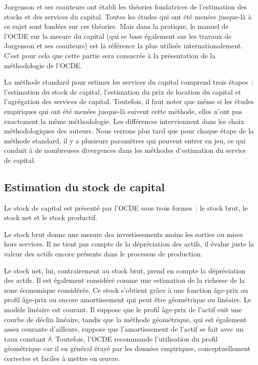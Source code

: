 \documentclass[12pt,a4paper,oneside]{report}
\begin{document}
Jorgenson et ses coauteurs ont établi les théories fondatrices de l’estimation des stocks et des services du
capital. Toutes les études qui ont été menées jusque-là à ce sujet sont fondées sur ces théories. Mais dans la
pratique, le manuel de l’OCDE sur la mesure du capital (qui se base également sur les travaux de Jorgenson et
ses coauteurs) est la référence la plus utilisée internationalement. C’est pour cela que cette partie sera
consacrée à la présentation de la méthodologie de l’OCDE.

La méthode standard pour estimer les services du capital comprend trois étapes~: l’estimation du stock de
capital, l’estimation du prix de location du capital et l’agrégation des services de capital. Toutefois, il
faut noter que même si les études empiriques qui ont été menées jusque-là suivent cette méthode, elles n’ont
pas exactement la même méthodologie. Les différences interviennent dans les choix méthodologiques des auteurs.
Nous verrons plus tard que pour chaque étape de la méthode standard, il y a plusieurs paramètres qui peuvent
entrer en jeu, ce qui conduit à de nombreuses divergences dans les méthodes d’estimation du service de
capital.

\subsection{Estimation du stock de capital}

Le stock de capital est présenté par l’OCDE sous trois formes~: le stock brut, le stock net et le stock
productif.

Le stock brut donne une mesure des investissements moins les sorties ou mises hors services. Il ne tient pas
compte de la dépréciation des actifs, il évalue juste la valeur des actifs encore présents dans le processus
de production.

Le stock net, lui, contrairement au stock brut, prend en compte la dépréciation des actifs. Il est également
considéré comme une estimation de la richesse de la zone économique considérée. Ce stock s’obtient grâce à une
fonction âge-prix ou profil âge-prix ou encore amortissement qui peut être géométrique ou linéaire. Le modèle
linéaire est courant. Il suppose que le profil âge-prix de l’actif suit une courbe de déclin linéaire, tandis
que la méthode géométrique, qui est également assez courante d’ailleurs, suppose que l’amortissement de
l’actif se fait avec un taux constant \(\delta \). Toutefois, l’OCDE recommande l’utilisation du profil
géométrique car il en général étayé par les données empiriques, conceptuellement correctes et faciles à mettre
en œuvre.
\end{document}
